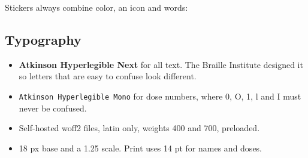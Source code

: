 \documentclass[11pt]{article}
\begin{document}
Stickers always combine color, an icon and words:
  

\subsection{Typography}
\begin{itemize}
  \item \textbf{Atkinson Hyperlegible Next} for all text. The Braille Institute designed it so letters that are easy to confuse look different.
  \item \texttt{Atkinson Hyperlegible Mono} for dose numbers, where 0, O, 1, l and I must never be confused.
  \item Self-hosted woff2 files, latin only, weights 400 and 700, preloaded.
  \item 18 px base and a 1.25 scale. Print uses 14 pt for names and doses.
\end{itemize}
\end{document}
